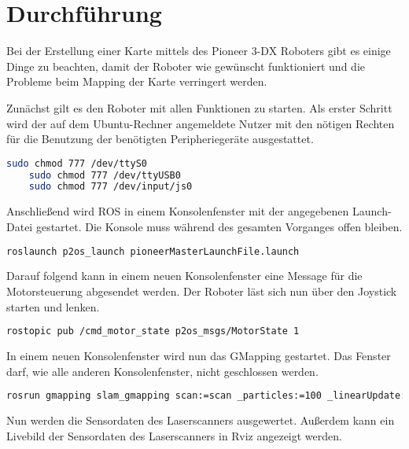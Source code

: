 \chapter{Durchführung} %
\label{cha:durchfuehrung}

Bei der Erstellung einer Karte mittels des Pioneer 3-DX Roboters gibt es einige Dinge zu beachten, damit der Roboter wie gewünscht funktioniert und die Probleme beim Mapping der Karte verringert werden.\par
Zunächst gilt es den Roboter mit allen Funktionen zu starten.
Als erster Schritt wird der auf dem Ubuntu-Rechner angemeldete Nutzer mit den nötigen Rechten für die Benutzung der benötigten Pe­ri­phe­rie­ge­räte ausgestattet.

\begin{lstlisting}[language=sh,caption=Rechteverteilung]
    sudo chmod 777 /dev/ttyS0
    sudo chmod 777 /dev/ttyUSB0
    sudo chmod 777 /dev/input/js0
\end{lstlisting}

Anschließend wird \ac{ROS} in einem Konsolenfenster mit der angegebenen Launch-Datei gestartet. Die Konsole muss während des gesamten Vorganges offen bleiben.

\begin{lstlisting}[language=sh,caption=Starten von \ac{ROS}]
    roslaunch p2os_launch pioneerMasterLaunchFile.launch
\end{lstlisting}

Darauf folgend kann in einem neuen Konsolenfenster eine Message für die Motorsteuerung abgesendet werden. Der Roboter läst sich nun über den Joystick starten und lenken.

\begin{lstlisting}[language=sh,caption=Starten des Motors]
    rostopic pub /cmd_motor_state p2os_msgs/MotorState 1
\end{lstlisting}

In einem neuen Konsolenfenster wird nun das GMapping gestartet. Das Fenster darf, wie alle anderen Konsolenfenster, nicht geschlossen werden.

\begin{lstlisting}[language=sh,caption=Starten von GMapping]
    rosrun gmapping slam_gmapping scan:=scan _particles:=100 _linearUpdate:=0.1 _angularUpdate:=0.03
\end{lstlisting}

Nun werden die Sensordaten des Laserscanners ausgewertet. Außerdem kann ein Livebild der Sensordaten des Laserscanners in Rviz angezeigt werden. 

